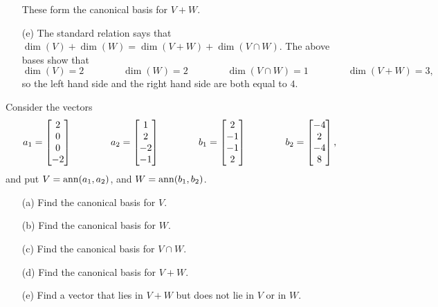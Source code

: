 \documentclass[a4paper]{article}
\begin{document}
\begin{solution}
\begin{itemize}
\[   \]
   These form the canonical basis for $V+W$. 
  \item[(e)] The standard relation says that
   $\dim(V)+\dim(W)=\dim(V+W)+\dim(V\cap W)$. \mk
   The above bases show that 
   \[ \dim(V) = 2 \hspace{4em}
      \dim(W) = 2 \hspace{4em}
      \dim(V\cap W) = 1 \hspace{4em}
      \dim(V+W) = 3,
   \]
   so the left hand side and the right hand side are both equal to
   $4$. \mk
 \end{itemize}
\end{solution}

\begin{problem}[2012-13]
 Consider the vectors
 \[ a_1 = \left[\begin{matrix}  2 \\  0 \\  0 \\ -2 \end{matrix}\right] \hspace{4em}
    a_2 = \left[\begin{matrix}  1 \\  2 \\ -2 \\ -1 \end{matrix}\right] \hspace{4em}
    b_1 = \left[\begin{matrix}  2 \\ -1 \\ -1 \\  2 \end{matrix}\right] \hspace{4em}
    b_2 = \left[\begin{matrix} -4 \\  2 \\ -4 \\  8 \end{matrix}\right],
 \]
 and put $V=\operatorname{ann}(a_1,a_2)$, and $W=\operatorname{ann}(b_1,b_2)$.
 \begin{itemize}
  \item[(a)] Find the canonical basis for $V$. 
  \item[(b)] Find the canonical basis for $W$. 
  \item[(c)] Find the canonical basis for $V\cap W$. 
  \item[(d)] Find the canonical basis for $V+W$. 
  \item[(e)] Find a vector that lies in $V+W$ but does not lie in $V$
   or in $W$. 
 \end{itemize}
\end{problem}
\end{document}
